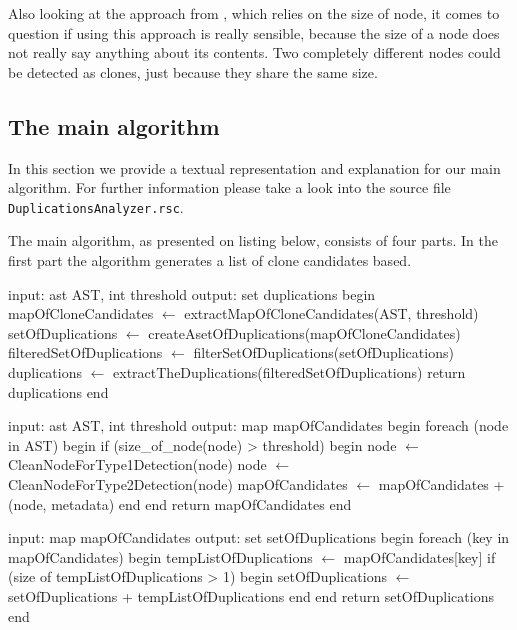 \documentclass{uva-inf-article}
\begin{document}
Also looking at the approach from \cite{baxter1998clone}, which relies on the size of node, it comes to question if using this approach is really sensible, because the size of a node does not really say anything about its contents. Two completely different nodes could be detected as clones, just because they share the same size.

\subsection{The main algorithm}\label{main_alg}

In this section we provide a textual representation and explanation for our main algorithm. For further information please take a look into the source file \texttt{DuplicationsAnalyzer.rsc}.

The main algorithm, as presented on listing below, consists of four parts. In the first part the algorithm generates a list of clone candidates based.

\begin{pseudocode}[caption={Consolidated general algorithm.}, label={alg0}]
 input: ast AST, int threshold
 output: set duplications
 begin
  mapOfCloneCandidates $\gets$ extractMapOfCloneCandidates(AST, threshold)
  setOfDuplications $\gets$ createAsetOfDuplications(mapOfCloneCandidates)
  filteredSetOfDuplications $\gets$ filterSetOfDuplications(setOfDuplications)
  duplications $\gets$ extractTheDuplications(filteredSetOfDuplications)
  return duplications
 end       
\end{pseudocode}

\begin{pseudocode}[caption={Extracting a map of clone candidates.}, label={alg1}]
 input: ast AST, int threshold
 output: map mapOfCandidates
 begin
  foreach (node in AST)
  begin
    if (size_of_node(node)  > threshold)
    begin
        node $\gets$ CleanNodeForType1Detection(node)
        node $\gets$ CleanNodeForType2Detection(node)
        mapOfCandidates $\gets$ mapOfCandidates + (node, metadata)
    end
  end
  return mapOfCandidates
 end       
\end{pseudocode}

\begin{pseudocode}[caption={Creating a set of duplications.}, label={alg2}]
 input: map mapOfCandidates
 output: set setOfDuplications
 begin
  foreach (key in mapOfCandidates)
  begin
    tempListOfDuplications $\gets$ mapOfCandidates[key]
    if (size of tempListOfDuplications > 1)
    begin
        setOfDuplications $\gets$ setOfDuplications + tempListOfDuplications
    end
  end
  return setOfDuplications
 end       
\end{pseudocode}
\end{document}
